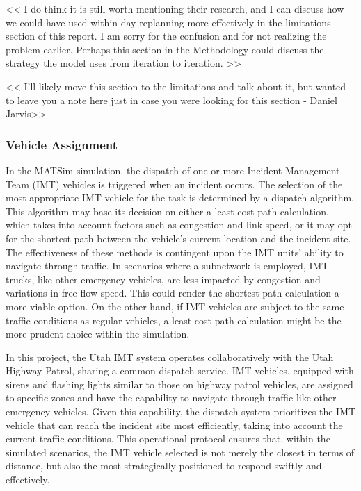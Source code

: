\documentclass[
  letterpaper,
  authoryear]{elsarticle}
\begin{document}
\textless\textless{} I do think it is still worth mentioning their
research, and I can discuss how we could have used within-day replanning
more effectively in the limitations section of this report. I am sorry
for the confusion and for not realizing the problem earlier. Perhaps
this section in the Methodology could discuss the strategy the model
uses from iteration to iteration. \textgreater\textgreater{}

\textless\textless{} I'll likely move this section to the limitations
and talk about it, but wanted to leave you a note here just in case you
were looking for this section - Daniel Jarvis\textgreater\textgreater{}

\hypertarget{vehicle-assignment}{%
\subsubsection{Vehicle Assignment}\label{vehicle-assignment}}

In the MATSim simulation, the dispatch of one or more Incident
Management Team (IMT) vehicles is triggered when an incident occurs. The
selection of the most appropriate IMT vehicle for the task is determined
by a dispatch algorithm. This algorithm may base its decision on either
a least-cost path calculation, which takes into account factors such as
congestion and link speed, or it may opt for the shortest path between
the vehicle's current location and the incident site. The effectiveness
of these methods is contingent upon the IMT units' ability to navigate
through traffic. In scenarios where a subnetwork is employed, IMT
trucks, like other emergency vehicles, are less impacted by congestion
and variations in free-flow speed. This could render the shortest path
calculation a more viable option. On the other hand, if IMT vehicles are
subject to the same traffic conditions as regular vehicles, a least-cost
path calculation might be the more prudent choice within the simulation.

In this project, the Utah IMT system operates collaboratively with the
Utah Highway Patrol, sharing a common dispatch service. IMT vehicles,
equipped with sirens and flashing lights similar to those on highway
patrol vehicles, are assigned to specific zones and have the capability
to navigate through traffic like other emergency vehicles. Given this
capability, the dispatch system prioritizes the IMT vehicle that can
reach the incident site most efficiently, taking into account the
current traffic conditions. This operational protocol ensures that,
within the simulated scenarios, the IMT vehicle selected is not merely
the closest in terms of distance, but also the most strategically
positioned to respond swiftly and effectively.
\end{document}
